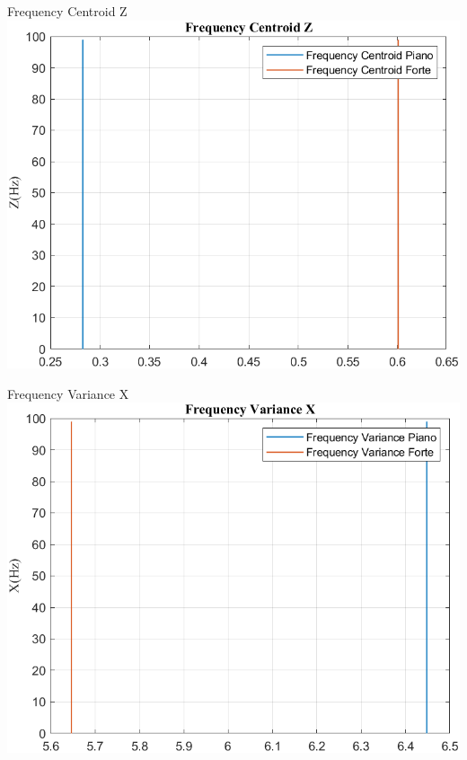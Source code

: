 \documentclass[beamer]{standalone}
\begin{document}
	\begin{frame}{{Frequency Centroid Z}}
		\centering\includegraphics[height=.8\textheight]{figure/Acc/Trasformata/Frequency CentroidZ}
	\end{frame}
	
	\begin{frame}{{Frequency Variance X}}
		\centering\includegraphics[height=.8\textheight]{figure/Acc/Trasformata/Frequency VarianceX}
	\end{frame}
	
\end{document}

